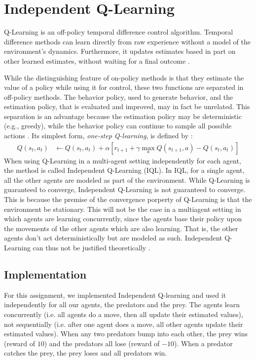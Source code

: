\newpage
\section{Independent Q-Learning}\label{sec:IQL}
Q-Learning is an off-policy temporal difference control algorithm. Temporal difference methods can learn directly from raw experience without a model of the environment's dynamics. Furthermore, it updates estimates based in part on other learned estimates, without waiting for a final outcome \cite[pp. 133]{RL1}. 

While the distinguishing feature of on-policy methods is that they estimate the value of a policy while using it for control, these two functions are separated in off-policy methods. The behavior policy, used to generate behavior, and the estimation policy, that is evaluated and improved, may in fact be unrelated. This separation is an advantage because the estimation policy may be deterministic (e.g., greedy), while the behavior policy can continue to sample all possible actions \cite[pp. 126]{RL1}. Its simplest form, \emph{one-step Q-learning}, is defined by \cite[pp. 148]{RL1}:
\begin{align*}
Q(s_t,a_t) & \leftarrow Q(s_t,a_t) + \alpha \left[ r_{t+1} + \gamma \displaystyle\max_a Q(s_{t+1},a) - Q(s_t,a_t) \right]
\end{align*}
When using Q-Learning in a multi-agent setting independently for each agent, the method is called Independent Q-Learning (IQL). In IQL, for a single agent, all the other agents are modeled as part of the environment. While Q-Learning is guaranteed to converge, Independent Q-Learning is not guaranteed to converge. This is because the premise of the convergence porperty of Q-Learning is that the environment be stationary. This will not be the case in a multiagent setting in which agents are learning concurrently, since the agents base their policy upon the movements of the other agents which are also learning. That is, the other agents don't act deterministically but are modeled as such. Independent Q-Learning can thus not be justified theoretically \cite[pp. 57]{vlassis}.

\subsection{Implementation}
For this assignment, we implemented Independent Q-learning and used it independently for all our agents, the predators and the prey. The agents learn concurrently (i.e. all agents do a move, then all update their estimated values), not sequentially (i.e. after one agent does a move, all other agents update their estimated values). When any two predators bump into each other, the prey wins (reward of $10$) and the predators all lose (reward of $-10$). When a predator catches the prey, the prey loses and all predators win.

